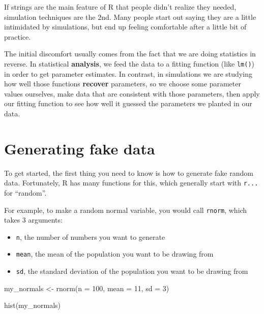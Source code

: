 \documentclass[
]{book}
\newenvironment{Shaded}{\begin{snugshade}}{\end{snugshade}}
\newcommand{\AttributeTok}[1]{\textcolor[rgb]{0.77,0.63,0.00}{#1}}
\newcommand{\DecValTok}[1]{\textcolor[rgb]{0.00,0.00,0.81}{#1}}
\newcommand{\FunctionTok}[1]{\textcolor[rgb]{0.00,0.00,0.00}{#1}}
\newcommand{\NormalTok}[1]{#1}
\newcommand{\OtherTok}[1]{\textcolor[rgb]{0.56,0.35,0.01}{#1}}
\providecommand{\tightlist}{%
  \setlength{\itemsep}{0pt}\setlength{\parskip}{0pt}}
\begin{document}
If strings are the main feature of R that people didn't realize they needed, simulation techniques are the 2nd. Many people start out saying they are a little intimidated by simulations, but end up feeling comfortable after a little bit of practice.

The initial discomfort usually comes from the fact that we are doing statistics in reverse. In statistical \textbf{analysis}, we feed the data to a fitting function (like \texttt{lm()}) in order to get parameter estimates. In contrast, in simulations we are studying how well those functions \textbf{recover} parameters, so we choose some parameter values ourselves, make data that are consistent with those parameters, then apply our fitting function to see how well it guessed the parameters we planted in our data.

\hypertarget{generating-fake-data}{%
\section{Generating fake data}\label{generating-fake-data}}

To get started, the first thing you need to know is how to generate fake random data. Fortunately, R has many functions for this, which generally start with \texttt{r...} for ``random''.

For example, to make a random normal variable, you would call \texttt{rnorm}, which takes 3 arguments:

\begin{itemize}
\tightlist
\item
  \texttt{n}, the number of numbers you want to generate
\item
  \texttt{mean}, the mean of the population you want to be drawing from
\item
  \texttt{sd}, the standard deviation of the population you want to be drawing from
\end{itemize}

\begin{Shaded}
\begin{Highlighting}[]
\NormalTok{my\_normals }\OtherTok{\textless{}{-}} \FunctionTok{rnorm}\NormalTok{(}\AttributeTok{n =} \DecValTok{100}\NormalTok{, }\AttributeTok{mean =} \DecValTok{11}\NormalTok{, }\AttributeTok{sd =} \DecValTok{3}\NormalTok{)}

\FunctionTok{hist}\NormalTok{(my\_normals)}
\end{Highlighting}
\end{Shaded}
\end{document}
